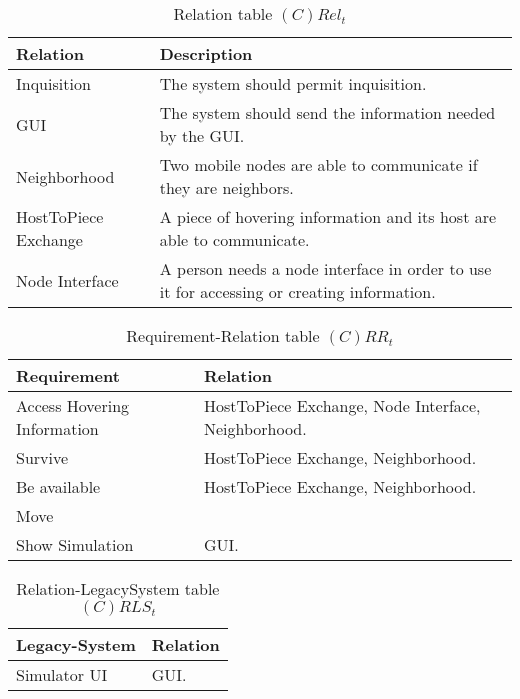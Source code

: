 \begin{table}[H]
	\centering
	\begin{tabular}{|p{4cm}|p{8cm}|}
			\hline
			\textbf{Relation} & \textbf{Description} \\
			\hline
			Inquisition & The system should permit inquisition. \\
			\hline
			GUI & The system should send the information needed by the GUI. \\
			\hline
			Neighborhood & Two mobile nodes are able to communicate if they are neighbors. \\
			\hline
			HostToPiece Exchange & A piece of hovering information and its host are able to communicate. \\
			\hline
			Node Interface & A person needs a node interface in order to use it for
			accessing or creating information. \\
			\hline
		\end{tabular}
	\caption{Relation table $(C)Rel_t$}
	\label{tab:crelt}
\end{table}

\begin{table}[H]
	\centering
	\begin{tabular}{|p{4cm}|p{8cm}|}
			\hline
			\textbf{Requirement} & \textbf{Relation} \\
			\hline
			Access Hovering Information & HostToPiece Exchange, Node Interface, Neighborhood.  \\
			\hline
			Survive & HostToPiece Exchange, Neighborhood. \\
			\hline
			Be available & HostToPiece Exchange, Neighborhood. \\
			\hline
			Move & \\
			\hline
			Show Simulation & GUI. \\
			\hline
		\end{tabular}
	\caption{Requirement-Relation table $(C)RR_t$}
	\label{tab:crrt}
\end{table}

\begin{table}[H]
	\centering
	\begin{tabular}{|p{4cm}|p{8cm}|}
			\hline
			\textbf{Legacy-System} & \textbf{Relation} \\
			\hline
			Simulator UI & GUI. \\
			\hline
		\end{tabular}
	\caption{Relation-LegacySystem table $(C)RLS_t$}
	\label{tab:crlst}
\end{table}


